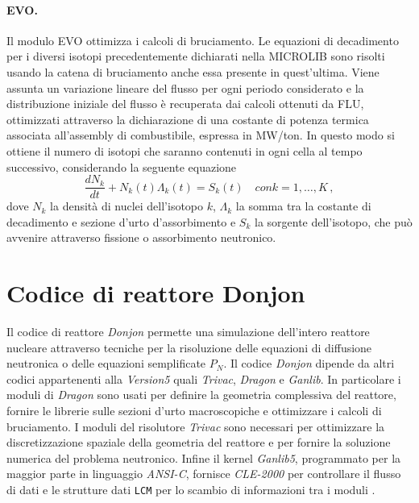\paragraph{EVO.}
Il modulo EVO ottimizza i calcoli di bruciamento. Le equazioni di decadimento 
per i diversi isotopi precedentemente dichiarati nella MICROLIB sono risolti 
usando la catena di bruciamento anche essa presente in quest'ultima.
Viene assunta un variazione lineare del flusso per ogni periodo considerato e 
la 
distribuzione iniziale del flusso è recuperata dai calcoli ottenuti da FLU, 
ottimizzati attraverso la dichiarazione di una costante di potenza termica 
associata all'assembly di combustibile, espressa in MW/ton. 
In questo modo si ottiene il numero di isotopi che saranno contenuti in ogni 
cella al tempo successivo, considerando la seguente equazione
\begin{equation}
 \frac{dN_k}{dt}+N_k(t)\Lambda_k(t)=S_k(t) \quad con k=1,\dots,K \,,
\end{equation}
dove $N_k$ la densità di nuclei dell'isotopo $k$, $\Lambda_k$ la somma tra la 
costante di decadimento e sezione d'urto d'assorbimento e $S_k$ la sorgente 
dell'isotopo, che può avvenire attraverso fissione o assorbimento neutronico.


\section{Codice di reattore Donjon \label{codicedonjon}}

Il codice di reattore \textit{Donjon} permette una simulazione dell'intero 
reattore 
nucleare 
attraverso tecniche per la risoluzione delle equazioni di diffusione neutronica 
o delle equazioni semplificate $P_N$.
Il codice \textit{Donjon} dipende da altri codici appartenenti alla 
\textit{Version5} quali 
\textit{Trivac}, \textit{Dragon} e \textit{Ganlib}. In particolare i moduli di 
\textit{Dragon} sono usati per 
definire la geometria complessiva del reattore, fornire le librerie sulle 
sezioni d'urto macroscopiche e ottimizzare i calcoli di bruciamento. I moduli 
del risolutore \textit{Trivac} sono necessari per ottimizzare la 
discretizzazione 
spaziale della geometria del reattore e per fornire la soluzione numerica del 
problema neutronico.
Infine il kernel \textit{Ganlib5}, programmato per la maggior parte in 
linguaggio \textit{ANSI-C}, 
fornisce \textit{CLE-2000} per controllare il flusso di dati e le strutture dati 
\texttt{LCM} per 
lo scambio di informazioni tra i moduli \cite{hebert2013dragon5}.


